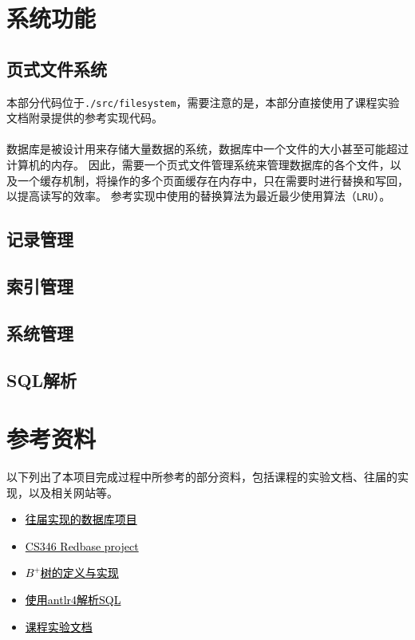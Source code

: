 \documentclass[11pt]{article}
\begin{document}
\section{系统功能}
\subsection{页式文件系统}
本部分代码位于\texttt{./src/filesystem}，需要注意的是，本部分直接使用了课程实验文档附录提供的参考实现代码。\\\\
数据库是被设计用来存储大量数据的系统，数据库中一个文件的大小甚至可能超过计算机的内存。
因此，需要一个页式文件管理系统来管理数据库的各个文件，以及一个缓存机制，将操作的多个页面缓存在内存中，只在需要时进行替换和写回，以提高读写的效率。
参考实现中使用的替换算法为最近最少使用算法（\texttt{LRU}）。
\subsection{记录管理}
\subsection{索引管理}
\subsection{系统管理}
\subsection{SQL解析}

\section{参考资料}
以下列出了本项目完成过程中所参考的部分资料，包括课程的实验文档、往届的实现，以及相关网站等。
\begin{itemize}
    \item \href{https://github.com/miskcoo/TrivialDB}{\textcolor{black}{往届实现的数据库项目}}
    \item \href{https://web.stanford.edu/class/cs346/2015/redbase.html}{\textcolor{black}{CS346 Redbase project}}
    \item \href{https://en.wikipedia.org/wiki/B%2B_tree}{\textcolor{black}{$B^+$树的定义与实现}}
    \item \href{https://www.antlr.org/download.html}{\textcolor{black}{使用antlr4解析SQL}}
    \item \href{https://thu-db.github.io/dbs-tutorial/}{\textcolor{black}{课程实验文档}}
\end{itemize}
\end{document}
